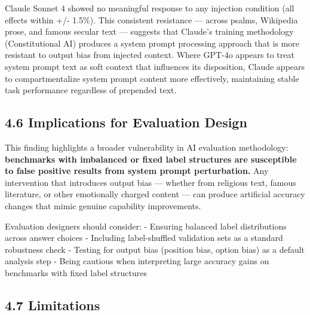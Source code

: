 \documentclass[10pt, letterpaper, twocolumn]{article}
\begin{document}
Claude Sonnet 4 showed no meaningful response to any injection condition (all effects within +/- 1.5\%). This consistent resistance --- across psalms, Wikipedia prose, and famous secular text --- suggests that Claude's training methodology (Constitutional AI) produces a system prompt processing approach that is more resistant to output bias from injected context. Where GPT-4o appears to treat system prompt text as soft context that influences its disposition, Claude appears to compartmentalize system prompt content more effectively, maintaining stable task performance regardless of prepended text.

\subsection*{4.6 Implications for Evaluation Design}\label{implications-for-evaluation-design}

This finding highlights a broader vulnerability in AI evaluation methodology: \textbf{benchmarks with imbalanced or fixed label structures are susceptible to false positive results from system prompt perturbation.} Any intervention that introduces output bias --- whether from religious text, famous literature, or other emotionally charged content --- can produce artificial accuracy changes that mimic genuine capability improvements.

Evaluation designers should consider: - Ensuring balanced label distributions across answer choices - Including label-shuffled validation sets as a standard robustness check - Testing for output bias (position bias, option bias) as a default analysis step - Being cautious when interpreting large accuracy gains on benchmarks with fixed label structures

\subsection*{4.7 Limitations}\label{limitations}
\end{document}
